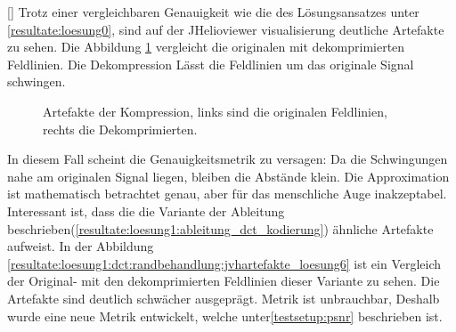 [\baselineskip]
Trotz einer vergleichbaren Genauigkeit wie die des Lösungsansatzes unter \ref{resultate:loesung0}, sind auf der JHelioviewer visualisierung deutliche Artefakte zu sehen. Die Abbildung \ref{resultate:loesung1:dct:randbehandlung:jvhartefakte} vergleicht die originalen mit dekomprimierten Feldlinien. Die Dekompression Lässt die Feldlinien um das originale Signal schwingen.
\begin{figure}[!htbp]
	\center
	\caption{Artefakte der Kompression, links sind die originalen Feldlinien, rechts die Dekomprimierten.}
	\label{resultate:loesung1:dct:randbehandlung:jvhartefakte}
\end{figure} 
In diesem Fall scheint die Genauigkeitsmetrik zu versagen: Da die Schwingungen nahe am originalen Signal liegen, bleiben die Abstände klein. Die Approximation ist mathematisch betrachtet genau, aber für das menschliche Auge inakzeptabel.\\
Interessant ist, dass die die Variante der Ableitung beschrieben(\ref{resultate:loesung1:ableitung_dct_kodierung}) ähnliche Artefakte aufweist. In der Abbildung \ref{resultate:loesung1:dct:randbehandlung:jvhartefakte_loesung6} ist ein Vergleich der Original- mit den dekomprimierten Feldlinien dieser Variante zu sehen. Die Artefakte sind deutlich schwächer ausgeprägt. Metrik ist unbrauchbar, Deshalb wurde eine neue Metrik entwickelt, welche unter\ref{testsetup:psnr} beschrieben ist.
